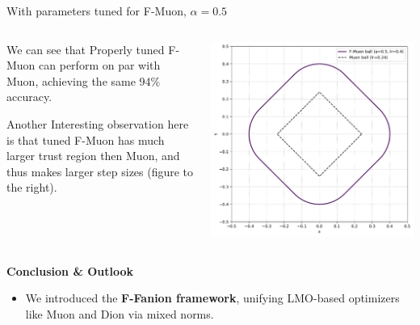 \documentclass[fontsize=10pt]{beamer}
\begin{document}
\begin{frame}[fragile]
\begin{columns}[T]
\begin{column}{0.30\textwidth}
\begin{columns}[T,totalwidth=\textwidth]
\begin{column}{0.48\textwidth}
        {\centering With parameters tuned for F-Muon, $\alpha = 0.5$\par}
      \end{column}
    \end{columns}\vspace{1em}

\begin{columns}[T,totalwidth=\textwidth]
  \begin{column}{0.47\textwidth}
    \setlength{\parskip}{0.7em}
\setlength{\parindent}{0pt}
\Large
    We can see that Properly tuned F-Muon can perform on par with Muon, achieving the same 94\% accuracy. 
    
    Another Interesting observation here is that tuned F-Muon has much larger trust region then Muon, and thus makes larger step sizes (figure to the right).
  \end{column}
  \begin{column}{0.49\textwidth}
    \includegraphics[width=\linewidth]{fstardual_cifar.pdf}
    \centering
  \end{column}
\end{columns}

\vspace{0.5em}
\textbf{\Huge\color{Zen}Conclusion \& Outlook}\\[0.6em]

\begin{itemize}
    \item We introduced the \textbf{\color{HazySummerEve}F-Fanion framework}, unifying LMO-based optimizers like Muon and Dion via mixed norms. 


\end{itemize}
\end{column}
\end{columns}
\end{frame}
\end{document}
